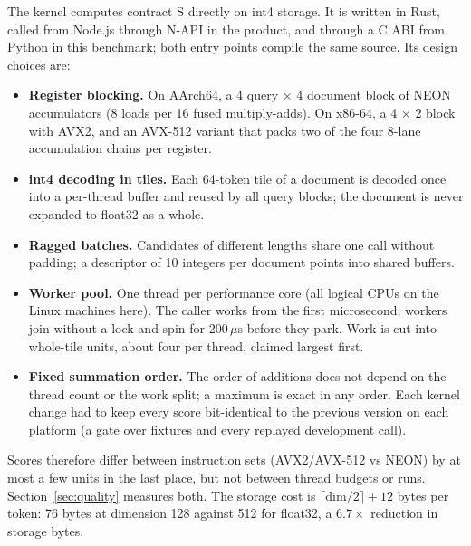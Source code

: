 The kernel computes contract S directly on int4 storage.
It is written in Rust, called from Node.js through N-API in the product, and through a C ABI from Python in this benchmark; both entry points compile the same source.
Its design choices are:
\begin{itemize}
\item \textbf{Register blocking.} On AArch64, a 4 query $\times$ 4 document block of NEON accumulators (8 loads per 16 fused multiply-adds). On x86-64, a 4 $\times$ 2 block with AVX2, and an AVX-512 variant that packs two of the four 8-lane accumulation chains per register.
\item \textbf{int4 decoding in tiles.} Each 64-token tile of a document is decoded once into a per-thread buffer and reused by all query blocks; the document is never expanded to float32 as a whole.
\item \textbf{Ragged batches.} Candidates of different lengths share one call without padding; a descriptor of 10 integers per document points into shared buffers.
\item \textbf{Worker pool.} One thread per performance core (all logical CPUs on the Linux machines here). The caller works from the first microsecond; workers join without a lock and spin for 200\,$\mu$s before they park. Work is cut into whole-tile units, about four per thread, claimed largest first.
\item \textbf{Fixed summation order.} The order of additions does not depend on the thread count or the work split; a maximum is exact in any order. Each kernel change had to keep every score bit-identical to the previous version on each platform (a gate over fixtures and every replayed development call).
\end{itemize}
Scores therefore differ between instruction sets (AVX2/AVX-512 vs NEON) by at most a few units in the last place, but not between thread budgets or runs.
Section~\ref{sec:quality} measures both.
The storage cost is $\lceil \text{dim}/2\rceil + 12$ bytes per token: 76 bytes at dimension 128 against 512 for float32, a $6.7\times$ reduction in storage bytes.
